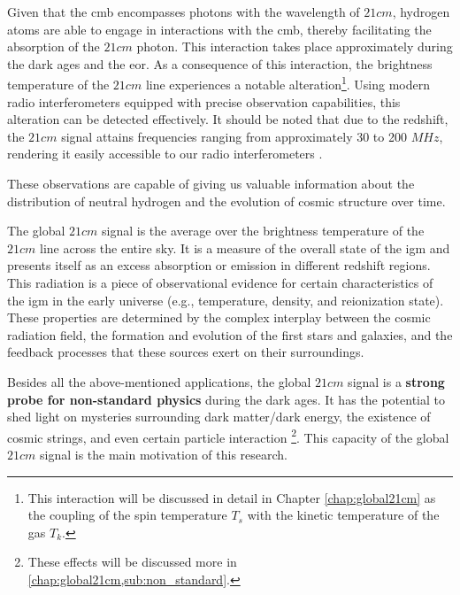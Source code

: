 \documentclass[12pt, TexShade, letterpaper]{report}
\begin{document}
Given that the \gls{cmb} encompasses photons with the wavelength of $21cm$, hydrogen atoms are able to engage in interactions with the \gls{cmb}, thereby facilitating the absorption of the $21cm$ photon. This interaction takes place approximately during the dark ages and the \gls{eor}. As a consequence of this interaction, the brightness temperature of the $21cm$ line experiences a notable alteration\footnote{This interaction will be discussed in detail in Chapter \ref{chap:global21cm} as the coupling of the spin temperature $T_s$ with the kinetic temperature of the gas $T_k$.}. Using modern radio interferometers equipped with precise observation capabilities, this alteration can be detected effectively. It should be noted that due to the redshift, the $21cm$ signal attains frequencies ranging from approximately 30 to 200 $MHz$, rendering it easily accessible to our radio interferometers \cite{low_frequency}.

These observations are capable of giving us valuable information about the distribution of neutral hydrogen and the evolution of cosmic structure over time\cite{low_frequency}.\par
The global $21cm$ signal is the average over the brightness temperature of the $21cm$ line across the entire sky. It is a measure of the overall state of the \gls{igm} and presents itself as an excess absorption or emission in different redshift regions. This radiation is a piece of observational evidence for certain characteristics of the \gls{igm} in the early universe (e.g., temperature, density, and reionization state). These properties are determined by the complex interplay between the cosmic radiation field, the formation and evolution of the first stars and galaxies, and the feedback processes that these sources exert on their surroundings\cite{21century}.\par
Besides all the above-mentioned applications, the global $21cm$ signal is a \textbf{strong probe for non-standard physics} during the dark ages. It has the potential to shed light on mysteries surrounding dark matter/dark energy, the existence of cosmic strings, and even certain particle interaction  \cite{dark_nature_21, constrain_dm_21, cosmic_string_brandenberger, ee_interaction_21, neutrino_21} \footnote{These effects will be discussed more in \ref{chap:global21cm,sub:non_standard}.}. This capacity of the global $21cm$ signal is the main motivation of this research.\par
\end{document}

